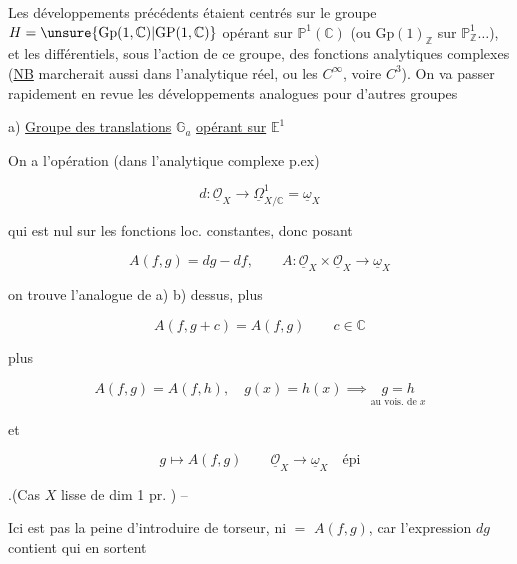 
Les développements précédents étaient centrés sur le groupe $H=\unsure{\mathrm{Gp}(1,\mathbb C)|\mathrm{GP}(1,\mathbb C)}$ opérant sur $\mathbb P^1(\mathbb C)$ (ou $\mathrm{Gp}(1)_{\mathbb Z}$ sur $\mathbb P^1_{\mathbb Z}\ldots$), et les  différentiels, sous l'action de ce groupe, des fonctions analytiques complexes (\uline{NB} marcherait aussi dans l'analytique réel, ou les $C^\infty$, voire $C^3$). On va passer rapidement en revue les développements analogues pour d'autres groupes

a) \uline{Groupe des translations} $\mathbb G_a$ \uline{opérant sur} $\mathbb E^1$

On a l'opération (dans l'analytique complexe p.ex)

\[
d:\underline{\mathcal O}_X\longrightarrow\underline\Omega^1_{X/\mathbb C}=\underline\omega_X
\]


qui est  nul  sur les fonctions loc. constantes, donc posant

\[
A(f,g)=dg-df,\qquad A:\underline{\mathcal O}_X\times\underline{\mathcal O}_X\longrightarrow\underline\omega_X
\]

on trouve l'analogue de a) b) dessus, plus

\[
 A(f,g+c)=A(f,g)\qquad c\in\mathbb C
\]

plus

\[
 A(f,g)=A(f,h),\quad g(x)=h(x)\implies \underset{\text{au vois. de }x}{g=h}
\]

et

\[
g\mapsto A(f,g)\qquad \underline{\mathcal O}_X\longrightarrow\underline\omega_X\quad \text{épi}
\]

.(Cas $X$ lisse de dim 1 pr. ) --

Ici est pas la peine d'introduire de torseur,  ni $=$ $A(f,g)$, car l'expression $dg$ contient  qui en sortent
